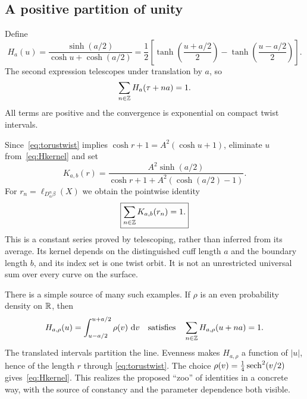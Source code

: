 \subsection{A positive partition of unity}

Define
\begin{equation}
 H_a(u)=\frac{\sinh(a/2)}{\cosh u+\cosh(a/2)}
 =\frac12\left[
 \tanh\left(\frac{u+a/2}{2}\right)
 -\tanh\left(\frac{u-a/2}{2}\right)\right].
 \label{eq:Hkernel}
\end{equation}
The second expression telescopes under translation by $a$, so
\begin{equation}
 \sum_{n\in\mathbb Z}H_a(\tau+na)=1.
 \label{eq:Hidentity}
\end{equation}
All terms are positive and the convergence is exponential on compact
twist intervals.

Since~\eqref{eq:torustwist} implies
$\cosh r+1=A^2(\cosh u+1)$, eliminate $u$ from~\eqref{eq:Hkernel} and set
\begin{equation}
 K_{a,b}(r)=
 \frac{A^2\sinh(a/2)}
      {\cosh r+1+A^2(\cosh(a/2)-1)}.
 \label{eq:Kkernel}
\end{equation}
For $r_n=\ell_{D_\alpha^n\beta}(X)$ we obtain the pointwise identity
\begin{equation}
 \boxed{\sum_{n\in\mathbb Z}K_{a,b}(r_n)=1.}
 \label{eq:Kidentity}
\end{equation}
This is a constant series proved by telescoping, rather than inferred from
its average. Its kernel depends on the distinguished cuff length $a$ and
the boundary length $b$, and its index set is one twist orbit. It is not
an unrestricted universal sum over every curve on the surface.

There is a simple source of many such examples. If $\rho$ is an even
probability density on $\mathbb R$, then
\[
 H_{a,\rho}(u)=\int_{u-a/2}^{u+a/2}\rho(v)\,\mathop{}\!\mathrm d v
 \quad\text{satisfies}\quad
 \sum_{n\in\mathbb Z}H_{a,\rho}(u+na)=1.
\]
The translated intervals partition the line. Evenness makes
$H_{a,\rho}$ a function of $|u|$, hence of the length $r$ through
\eqref{eq:torustwist}. The choice
$\rho(v)=\frac14\operatorname{sech}^2(v/2)$ gives~\eqref{eq:Hkernel}.
This realizes the proposed ``zoo'' of identities in a concrete way, with
the source of constancy and the parameter dependence both visible.

